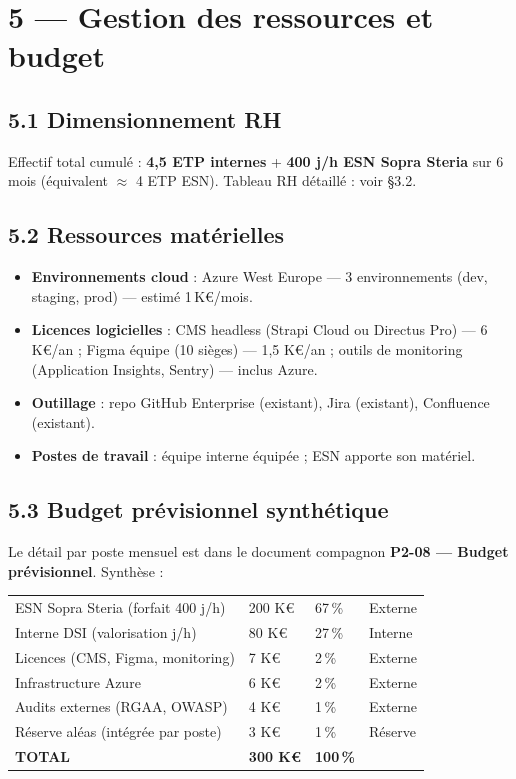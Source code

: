 \documentclass[11pt,a4paper,oneside]{report}
\begin{document}
\section*{5 --- Gestion des ressources et budget}

\subsection*{5.1 Dimensionnement RH}
Effectif total cumulé : \textbf{4{,}5 ETP internes} + \textbf{400 j/h ESN Sopra Steria} sur 6 mois (équivalent $\approx$ 4 ETP ESN). Tableau RH détaillé : voir §3.2.

\subsection*{5.2 Ressources matérielles}
\begin{itemize}
  \item \textbf{Environnements cloud} : Azure West Europe --- 3 environnements (dev, staging, prod) --- estimé 1\,K€/mois.
  \item \textbf{Licences logicielles} : CMS headless (Strapi Cloud ou Directus Pro) --- 6 K€/an ; Figma équipe (10 sièges) --- 1{,}5 K€/an ; outils de monitoring (Application Insights, Sentry) --- inclus Azure.
  \item \textbf{Outillage} : repo GitHub Enterprise (existant), Jira (existant), Confluence (existant).
  \item \textbf{Postes de travail} : équipe interne équipée ; ESN apporte son matériel.
\end{itemize}

\subsection*{5.3 Budget prévisionnel synthétique}
Le détail par poste mensuel est dans le document compagnon \textbf{P2-08 --- Budget prévisionnel}. Synthèse :

\renewcommand{\arraystretch}{1.3}
\begin{tabularx}{\textwidth}{L{6cm} C{2.5cm} C{2cm} Y}
\toprule
{} &  &  &  \\
\midrule
ESN Sopra Steria (forfait 400 j/h)    & 200 K€ & 67\,\% & Externe \\
Interne DSI (valorisation j/h)        &  80 K€ & 27\,\% & Interne \\
Licences (CMS, Figma, monitoring)     &   7 K€ &  2\,\% & Externe \\
Infrastructure Azure                  &   6 K€ &  2\,\% & Externe \\
Audits externes (RGAA, OWASP)         &   4 K€ &  1\,\% & Externe \\
Réserve aléas (intégrée par poste)    &   3 K€ &  1\,\% & Réserve \\
\midrule
{}
\textbf{TOTAL}                        & \textbf{300 K€} & \textbf{100\,\%} & \\
\bottomrule
\end{tabularx}
\end{document}
